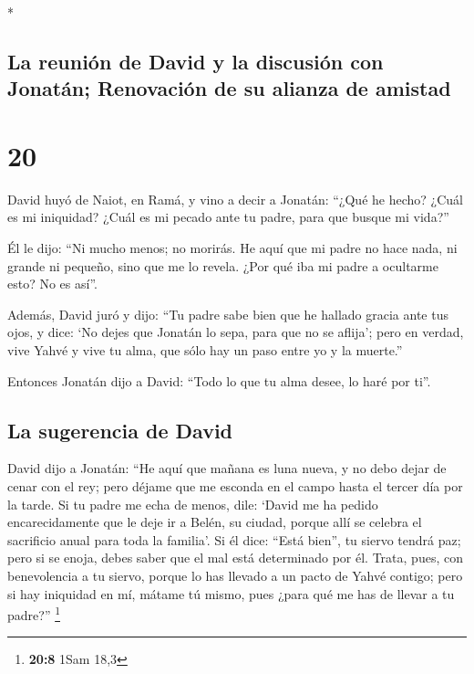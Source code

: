 \begin{paracol}{2}
\begin{otherlanguage}{english}
\end{otherlanguage}

\switchcolumn[0]*

\hypertarget{la-reuniuxf3n-de-david-y-la-discusiuxf3n-con-jonatuxe1n-renovaciuxf3n-de-su-alianza-de-amistad}{%
\subsection{La reunión de David y la discusión con Jonatán; Renovación
de su alianza de
amistad}\label{la-reuniuxf3n-de-david-y-la-discusiuxf3n-con-jonatuxe1n-renovaciuxf3n-de-su-alianza-de-amistad}}

\hypertarget{section-38}{%
\section{20}\label{section-38}}

 David huyó de Naiot, en Ramá, y vino a decir a Jonatán:
``¿Qué he hecho? ¿Cuál es mi iniquidad? ¿Cuál es mi pecado ante tu
padre, para que busque mi vida?''

 Él le dijo: ``Ni mucho menos; no morirás. He aquí que mi
padre no hace nada, ni grande ni pequeño, sino que me lo revela. ¿Por
qué iba mi padre a ocultarme esto? No es así''.

 Además, David juró y dijo: ``Tu padre sabe bien que he
hallado gracia ante tus ojos, y dice: `No dejes que Jonatán lo sepa,
para que no se aflija'; pero en verdad, vive Yahvé y vive tu alma, que
sólo hay un paso entre yo y la muerte.''

 Entonces Jonatán dijo a David: ``Todo lo que tu alma
desee, lo haré por ti''.

\hypertarget{la-sugerencia-de-david}{%
\subsection{La sugerencia de David}\label{la-sugerencia-de-david}}

 David dijo a Jonatán: ``He aquí que mañana es luna nueva,
y no debo dejar de cenar con el rey; pero déjame que me esconda en el
campo hasta el tercer día por la tarde.  Si tu padre me
echa de menos, dile: `David me ha pedido encarecidamente que le deje ir
a Belén, su ciudad, porque allí se celebra el sacrificio anual para toda
la familia'.  Si él dice: ``Está bien'', tu siervo tendrá
paz; pero si se enoja, debes saber que el mal está determinado por él.
 Trata, pues, con benevolencia a tu siervo, porque lo has
llevado a un pacto de Yahvé contigo; pero si hay iniquidad en mí, mátame
tú mismo, pues ¿para qué me has de llevar a tu padre?'' \footnote{\textbf{20:8}
  1Sam 18,3}


\end{paracol}
